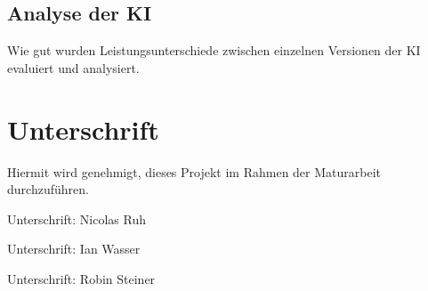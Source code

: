 \documentclass{article}
\begin{document}
\subsection{Analyse der KI}
\label{chap:erklaerung}
Wie gut wurden Leistungsunterschiede zwischen einzelnen Versionen der KI evaluiert und analysiert.




\section{Unterschrift}
\label{chap:unterschrift}

Hiermit wird genehmigt, dieses Projekt im Rahmen der Maturarbeit
durchzuführen.

\vspace*{1cm}

Unterschrift: \hrulefill Nicolas Ruh \vspace*{2cm}

Unterschrift: \hrulefill Ian Wasser \vspace*{2cm}

Unterschrift: \hrulefill Robin Steiner \vspace*{2cm}

\printbibliography[heading=bibintoc]
\end{document}
